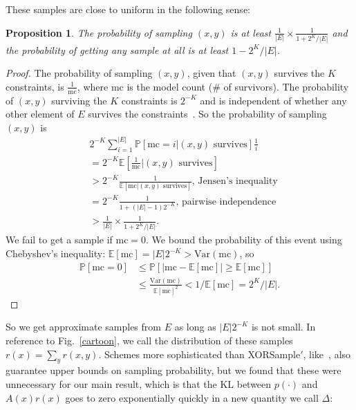 \documentclass{article}
\newcommand{\Expect}{\mathds{E}} %
\newcommand{\Probability}{\mathds{P}} %
\newtheorem{proposition}{Proposition}
\begin{document}
  These samples are close to uniform in the following sense: %
  \begin{proposition}\label{propositionLowerBound}
    The probability of sampling $(x,y)$ is at least $\frac{1}{|E|}\times \frac{1}{1 + 2^K/|E|}$ and the probability of getting any sample at all is at least $1 - 2^{K}/|E|$.
  \end{proposition}
  \begin{proof}
    The probability of sampling $(x,y)$, given that $(x,y)$ survives the $K$ constraints,
    is $\frac{1}{\text{mc}}$, where $\text{mc}$ is the model count (\# of survivors).
    The probability of $(x,y)$ surviving the $K$ constraints is $2^{-K}$ and is independent of whether any other element of $E$ survives the constraints~\cite{gomes2006near}.
    So the probability of sampling $(x,y)$ is
    \begin{align}
      &      2^{-K}\sum_{i = 1}^{|E|} \Probability\left[ \text{mc} = i | (x,y) \text{ survives}\right] \frac{1}{i}\\
      & = 2^{-K} \Expect\left[\frac{1}{\text{mc}} \vert (x,y) \text{ survives} \right] \\
      &> 2^{-K} \frac{1}{\Expect[\text{mc}|(x,y) \text{ survives}]}\text{, Jensen's inequality}\\
      &= 2^{-K} \frac{1}{1 + (|E|-1)2^{-K}}\text{, pairwise independence}\\
      &> \frac{1}{|E|}\times \frac{1}{1 + 2^K/|E|}.
      \end{align}
    We fail to get a sample if $\text{mc} = 0$. We bound the probability of this event using Chebyshev's inequality: $\Expect [\text{mc}] = |E|2^{-K}>\text{Var}(\text{mc})$, so
    \begin{align}
      \Probability [\text{mc}= 0]&\leq \Probability [ |\text{mc}-\Expect [\text{mc}]|\geq \Expect [\text{mc}]]\\
      &\leq \frac{\text{Var}(\text{mc})}{\Expect [\text{mc}]^2}<1/\Expect[\text{mc}] = 2^K/|E|.
    \end{align}
  \end{proof}
  So we get approximate samples from $E$ as long as $|E|2^{-K}$ is not small.
  In reference to Fig.~\ref{cartoon},
  we call the distribution of these samples $r(x)=\sum_y r(x,y)$.
  Schemes more sophisticated than XORSample$'$, like~\cite{ermon2013embed}, also guarantee upper bounds on sampling probability, but we found that these were unnecessary for our main result, which is that the KL between $p(\cdot )$ and $A(x)r(x)$ goes to zero exponentially quickly in a new quantity we call $\Delta$:
\end{document}
